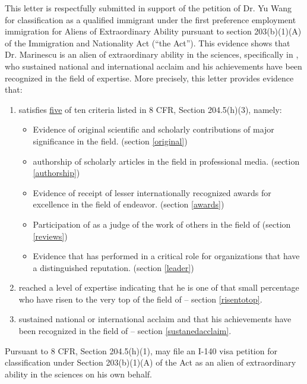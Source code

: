 \documentclass[11pt]{article}
\begin{document}
This letter is respectfully submitted in support of the petition of Dr. Yu Wang for classification as a qualified immigrant under the first preference employment immigration for Aliens of Extraordinary Ability pursuant to section 203(b)(1)(A) of the Immigration and Nationality Act (“the Act”). This evidence shows that Dr. Marinescu is an alien of extraordinary ability in the sciences, specifically in \underline{\fie{}}, who sustained national and international acclaim and his achievements have been recognized in the field of expertise. More precisely, this letter provides evidence that:
\begin{enumerate}
 \item \dr satisfies \underline{five}  of ten criteria listed in 8
CFR, Section 204.5(h)(3), namely:
\begin{itemize}
 \item Evidence of \drs original scientific and scholarly contributions of major significance in the field. (section \ref{original})
 \item \drs authorship of scholarly articles in the field in professional media. (section \ref{authorship})
 \item Evidence of receipt of lesser internationally recognized awards for excellence in the field of endeavor. (section \ref{awards})
 \item Participation of \dr as a judge of the work of others in the field of \fie{} (section \ref{reviews})
 \item Evidence that \dr has performed in a critical role for organizations that have a distinguished reputation. (section \ref{leader})
\end{itemize}
 \item \dr reached a level of expertise indicating that he is one of that small percentage who have risen to the very top of the field of \fie{} -- section \ref{risentotop}.
 \item \dr sustained national or international acclaim and that his achievements have been recognized in the field of \fie{} -- section \ref{sustanedacclaim}.
\end{enumerate}


Pursuant to 8 CFR, Section 204.5(h)(1), \dr may file an I-140 visa petition for classification under Section 203(b)(1)(A) of the Act as an alien of extraordinary ability in the sciences on his own behalf.\\
\end{document}
